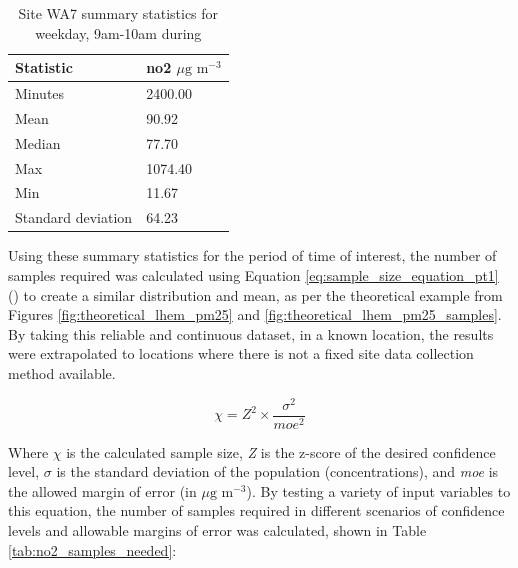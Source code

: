 \begin{table}[H]
\caption{Site WA7 summary statistics for weekday, 9am-10am during}
\centering
    \begin{tabular}{ | l | l |}
    \hline 
     \bfseries{Statistic}   & \bfseries{\gls{no2} $\mu \text{g m}^{-3}$}   \\ \hline
     Minutes                & 2400.00                                      \\ \hline
     Mean                   & 90.92                                        \\ \hline
     Median                 & 77.70                                        \\ \hline
     Max                    & 1074.40                                      \\ \hline
     Min                    & 11.67                                        \\ \hline
     Standard deviation     & 64.23                                        \\ \hline
    \end{tabular}
\label{tab:wa7_summary_stats}
\end{table}

Using these summary statistics for the period of time of interest, the number of samples required was calculated using Equation \ref{eq:sample_size_equation_pt1} (\cite{PennStateEberlyCollegeofScience2017}) to create a similar distribution and mean, as per the theoretical example from Figures \ref{fig:theoretical_lhem_pm25} and \ref{fig:theoretical_lhem_pm25_samples}. By taking this reliable and continuous dataset, in a known location, the results were extrapolated to locations where there is not a fixed site data collection method available.

\begin{equation}
  \chi = \textit{Z}^2 \times \frac{\sigma^2}{moe^2} 
  \label{eq:sample_size_equation_pt1}
\end{equation}

Where $\chi$ is the calculated sample size, \textit{Z} is the z-score of the desired confidence level, $\sigma$ is the standard deviation of the population (concentrations), and \textit{moe} is the allowed margin of error (in $\mu \text{g m}^{-3}$). By testing a variety of input variables to this equation, the number of samples required in different scenarios of confidence levels and allowable margins of error was calculated, shown in Table \ref{tab:no2_samples_needed}:

